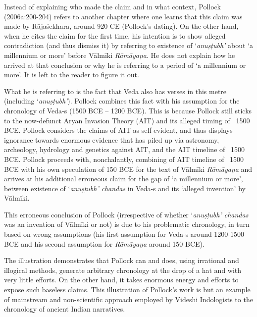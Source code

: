 Instead of explaining who made the claim and in what context, Pollock (2006a:200-204) refers to another chapter where one learns that this claim was made by Rājaśekhara, around 920 CE (Pollock’s dating). On the other hand, when he cites the claim for the first time, his intention is to show alleged contradiction (and thus dismiss it) by referring to existence of ‘\textit{anuṣṭubh’} about ‘a millennium or more’ before Vālmīki \textit{Rāmāyaṇa}. He does not explain how he arrived at that conclusion or why he is referring to a period of ‘a millennium or more’. It is left to the reader to figure it out.

What he is referring to is the fact that Veda also has verses in this metre (including ‘\textit{anuṣṭubh’}). Pollock combines this fact with his assumption for the chronology of Veda-s (1500 BCE – 1200 BCE). This is because Pollock still sticks to the now-defunct Aryan Invasion Theory (AIT) and its alleged timing of ~1500 BCE. Pollock considers the claims of AIT as self-evident, and thus displays ignorance towards enormous evidence that has piled up via astronomy, archeology, hydrology and genetics against AIT, and the AIT timeline of ~1500 BCE. Pollock proceeds with, nonchalantly, combining of AIT timeline of ~1500 BCE with his own speculation of 150 BCE for the text of Vālmīki \textit{Rāmāyaṇa} and arrives at his additional erroneous claim for the gap of ‘a millennium or more’, between existence of ‘\textit{anuṣṭubh’} \textit{chandas} in Veda-s and its ‘alleged invention’ by Vālmīki.

This erroneous conclusion of Pollock (irrespective of whether ‘\textit{anuṣṭubh’ chandas} was an invention of Vālmīki or not) is due to his problematic chronology, in turn based on wrong assumptions (his first assumption for Veda-s around 1200-1500 BCE and his second assumption for \textit{Rāmāyaṇa} around 150 BCE).

The illustration demonstrates that Pollock can and does, using irrational and illogical methods, generate arbitrary chronology at the drop of a hat and with very little efforts. On the other hand, it takes enormous energy and efforts to expose such baseless claims. This illustration of Pollock’s work is but an example of mainstream and non-scientific approach employed by Videshi Indologists to the chronology of ancient Indian narratives.


